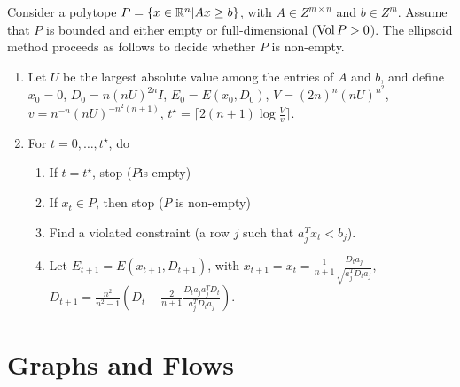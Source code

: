 \begin{defn}
  \label{sec:ellipsoid-method-1}
  Consider a polytope $P = \{ x \in \mathbb{R}^{n} | Ax \geq b \} $, with $A \in
  Z^{m \times n}$ and $b \in Z^{m}$.  Assume that $P$ is bounded and
  either empty or full-dimensional ($\operatorname*{Vol} P > 0$).  The ellipsoid
  method proceeds as follows to decide whether $P$ is non-empty.

  
  \begin{enumerate}
  \item Let $U$ be the largest absolute value among the entries of $A$
    and $b$, and define $x_{0} = 0$, $D_{0} = n(nU)^{2n}I$, $E_{0} =
    E(x_{0}, D_{0})$, $V = (2n)^{n}(nU)^{n^{2}}$, $v =
    n^{-n}(nU)^{-n^{2}(n+1)}$, $t^{\star} = \lceil 2(n+1) \log
    \frac{V}{v} \rceil$.
  \item For $t = 0, \dots, t^{\star}$, do
    \begin{enumerate}
    \item If $t = t^{\star}$, stop ($P$is empty)
    \item If $x_{t} \in P$, then stop ($P$ is non-empty)
    \item Find a violated constraint (a row $j$ such that $a_{j}^{T}
      x_{t} < b_{j}$).
    \item Let $E_{t+1} = E(x_{t+1}, D_{t+1})$, with $x_{t+1} = x_{t} =
      \frac{1}{n+1} \frac{D_{t} a_{j}}{\sqrt{a_{j}^{T} D_{t} a_{j}}}$,
      $D_{t+1} = \frac{n^{2}}{n^{2} - 1}(D_{t} - \frac{2}{n+1}
      \frac{D_{t} a_{j} a_{j}^{T} D_{t}}{a_{j}^{T} D_{t} a_{j}})$.
    \end{enumerate}
  \end{enumerate}
\end{defn}


\section{Graphs and Flows}
\label{sec:graphs-flows}

